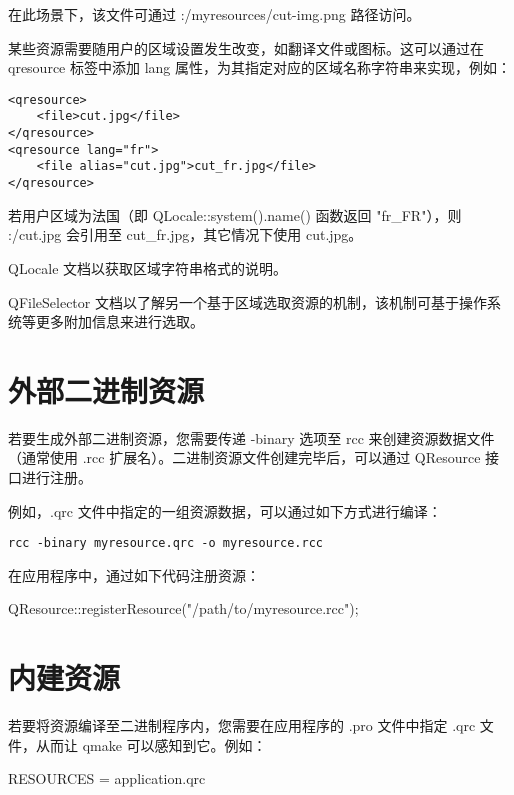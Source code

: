 在此场景下，该文件可通过 :/myresources/cut-img.png 路径访问。

某些资源需要随用户的区域设置发生改变，如翻译文件或图标。这可以通过在 qresource 标签中添加 lang 属性，为其指定对应的区域名称字符串来实现，例如：

\begin{lstlisting}
<qresource>
    <file>cut.jpg</file>
</qresource>
<qresource lang="fr">
    <file alias="cut.jpg">cut_fr.jpg</file>
</qresource>
\end{lstlisting}

若用户区域为法国（即 QLocale::system().name() 函数返回 "fr\_FR"），则 :/cut.jpg 会引用至 cut\_fr.jpg，其它情况下使用 cut.jpg。

\begin{seeAlso}
QLocale 文档以获取区域字符串格式的说明。
\end{seeAlso}

\begin{seeAlso}
QFileSelector 文档以了解另一个基于区域选取资源的机制，该机制可基于操作系统等更多附加信息来进行选取。
\end{seeAlso}

\section{外部二进制资源}

若要生成外部二进制资源，您需要传递 -binary 选项至 rcc 来创建资源数据文件（通常使用 .rcc 扩展名）。二进制资源文件创建完毕后，可以通过 QResource 接口进行注册。

例如，.qrc 文件中指定的一组资源数据，可以通过如下方式进行编译：

\begin{lstlisting}
rcc -binary myresource.qrc -o myresource.rcc
\end{lstlisting}

在应用程序中，通过如下代码注册资源：

\begin{cppcode}
QResource::registerResource("/path/to/myresource.rcc");
\end{cppcode}

\section{内建资源}

若要将资源编译至二进制程序内，您需要在应用程序的 .pro 文件中指定 .qrc 文件，从而让 qmake 可以感知到它。例如：

\begin{cppcode}
RESOURCES     = application.qrc
\end{cppcode}

